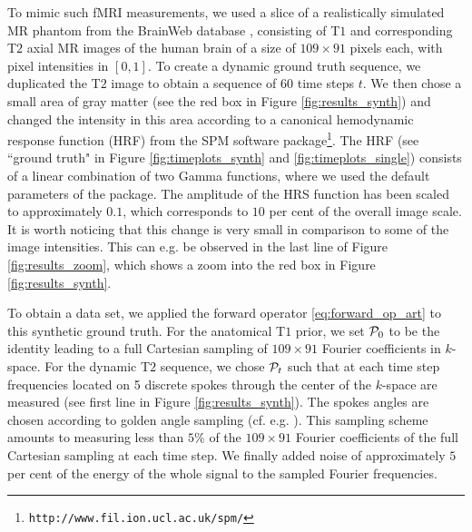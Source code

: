 To mimic such fMRI measurements, we used a slice of a realistically simulated MR phantom from the BrainWeb database \cite{cocosco:brainweb}, consisting of T$1$ and corresponding T$2$ axial MR images of the human brain of a size of $109 \times 91$ pixels each, with pixel intensities in $[0,1]$. 
To create a dynamic ground truth sequence, we duplicated the T$2$ image to obtain a sequence of 60 time steps $t$. 
We then chose a small area of gray matter (see the red box in Figure \ref{fig:results_synth}) and changed the intensity in this area according to a canonical hemodynamic response function (HRF) from the SPM software package\footnote{\texttt{http://www.fil.ion.ucl.ac.uk/spm/}}.
The HRF (see ``ground truth" in Figure \ref{fig:timeplots_synth} and \ref{fig:timeplots_single}) consists of a linear combination of two Gamma functions, where we used the default parameters of the package.
The amplitude of the HRS function has been scaled to approximately $0.1$, which corresponds to $10$ per cent of the overall image scale. 
It is worth noticing that this change is very small in comparison to some of the image intensities. 
This can e.g. be observed in the last line of Figure \ref{fig:results_zoom}, which shows a zoom into the red box in Figure \ref{fig:results_synth}.

To obtain a data set, we applied the forward operator \eqref{eq:forward_op_art} to this synthetic ground truth.
For the anatomical T$1$ prior, we set $\mathcal{P}_0$ to be the identity leading to a full Cartesian sampling of $109 \times 91$ Fourier coefficients in $k$-space. 
For the dynamic T$2$ sequence, we chose $\mathcal{P}_t$ such that at each time step frequencies located on 5 discrete spokes through the center of the $k$-space are measured (see first line in Figure \ref{fig:results_synth}). 
The spokes angles are chosen according to golden angle sampling (cf. e.g. \cite{winkelmann2007}).
This sampling scheme amounts to measuring less than $5 \%$ of the $109 \times 91$ Fourier coefficients of the full Cartesian sampling at each time step.
We finally added noise of approximately $5$ per cent of the energy of the whole signal to the sampled Fourier frequencies.
 
